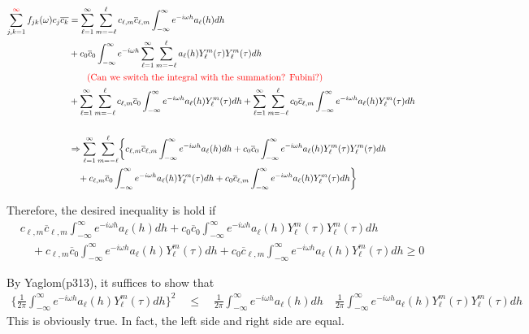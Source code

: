 \documentclass[11pt]{article}
\begin{document}
\begin{itemize}
\begin{align*}
\sum_{j,k=1}^{{\color{red}\infty}} f_{jk}(\omega) c_j \overline{c_k} &= \sum_{\ell=1}^\infty \sum_{m=-\ell}^{\ell} c_{\ell,m} \overline{c}_{\ell,m} \int_{-\infty}^{\infty} e^{-i \omega h}a_\ell(h) dh\\ 
&+ c_{0} \overline{c}_{0} \int_{-\infty}^{\infty} e^{-i \omega h} \sum_{\ell=1}^\infty \sum_{m=-\ell}^{\ell} a_\ell(h) Y_{\ell}^m(\tau) Y_{\ell}^m(\tau) dh\\ 
&\quad \quad \text{{\color{red}(Can we switch the integral with the summation? Fubini?)}}\\
&+ \sum_{\ell=1}^\infty \sum_{m=-\ell}^{\ell} c_{\ell,m} \overline{c}_{0} \int_{-\infty}^{\infty} e^{-i \omega h}a_\ell(h) Y_{\ell}^m(\tau) dh + \sum_{\ell=1}^\infty \sum_{m=-\ell}^{\ell} c_{0} \overline{c}_{\ell,m} \int_{-\infty}^{\infty} e^{-i \omega h}a_\ell(h) Y_{\ell}^m(\tau) dh\\
\\
&\Rightarrow \sum_{\ell=1}^\infty \sum_{m=-\ell}^{\ell} \biggl\{ c_{\ell,m} \overline{c}_{\ell,m} \int_{-\infty}^{\infty} e^{-i \omega h}a_\ell(h) dh + c_{0} \overline{c}_{0} \int_{-\infty}^{\infty} e^{-i \omega h} a_\ell(h) Y_{\ell}^m(\tau) Y_{\ell}^m(\tau) dh\\
&\quad + c_{\ell,m} \overline{c}_{0} \int_{-\infty}^{\infty} e^{-i \omega h}a_\ell(h) Y_{\ell}^m(\tau) dh + c_{0} \overline{c}_{\ell,m} \int_{-\infty}^{\infty} e^{-i \omega h}a_\ell(h) Y_{\ell}^m(\tau) dh \biggl\}\\
\end{align*}

Therefore, the desired inequality is hold if\\
\begin{align*}
&c_{\ell,m} \overline{c}_{\ell,m} \int_{-\infty}^{\infty} e^{-i \omega h}a_\ell(h) dh + c_{0} \overline{c}_{0} \int_{-\infty}^{\infty} e^{-i \omega h} a_\ell(h) Y_{\ell}^m(\tau) Y_{\ell}^m(\tau) dh\\
&\quad + c_{\ell,m} \overline{c}_{0} \int_{-\infty}^{\infty} e^{-i \omega h}a_\ell(h) Y_{\ell}^m(\tau) dh + c_{0} \overline{c}_{\ell,m} \int_{-\infty}^{\infty} e^{-i \omega h}a_\ell(h) Y_{\ell}^m(\tau) dh \ge 0
\end{align*}

By Yaglom(p313), it suffices to show that\\
\begin{align*}
\biggl\{ \frac{1}{2\pi} \int_{-\infty}^{\infty} e^{-i \omega h}a_\ell(h) Y_{\ell}^m(\tau) dh \biggl\}^2 \quad \le \quad \frac{1}{2\pi} \int_{-\infty}^{\infty} e^{-i \omega h}a_\ell(h) dh \quad \frac{1}{2\pi} \int_{-\infty}^{\infty} e^{-i \omega h}a_\ell(h) Y_{\ell}^m(\tau) Y_{\ell}^m(\tau) dh 
\end{align*}
This is obviously true. In fact, the left side and right side are equal.\\

\pagebreak

\end{itemize}
\end{document}
